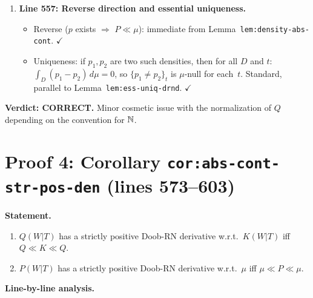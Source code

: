 \documentclass{article}
\begin{document}
\begin{enumerate}[leftmargin=*]
  \item \textbf{Line 557: Reverse direction and essential uniqueness.}
    \begin{itemize}
      \item Reverse ($p$ exists $\Rightarrow$ $P \ll \mu$): immediate from
            Lemma~\texttt{lem:density-abs-cont}.  $\checkmark$
      \item Uniqueness: if $p_1,p_2$ are two such densities, then for all $D$
            and $t$: $\int_D(p_1-p_2)\,d\mu = 0$, so $\{p_1 \neq p_2\}_t$ is
            $\mu$-null for each~$t$.  Standard, parallel to
            Lemma~\texttt{lem:ess-uniq-drnd}.  $\checkmark$
    \end{itemize}
\end{enumerate}

\textbf{Verdict: CORRECT.}  Minor cosmetic issue with the normalization of $Q$
depending on the convention for $\mathbb{N}$.

\section{Proof 4: Corollary \texttt{cor:abs-cont-str-pos-den} (lines 573--603)}

\textbf{Statement.}
\begin{enumerate}
  \item $Q(W|T)$ has a strictly positive Doob-RN derivative w.r.t.\ $K(W|T)$ iff
        $Q \ll K \ll Q$.
  \item $P(W|T)$ has a strictly positive Doob-RN derivative w.r.t.\ $\mu$ iff
        $\mu \ll P \ll \mu$.
\end{enumerate}

\textbf{Line-by-line analysis.}
\end{document}
